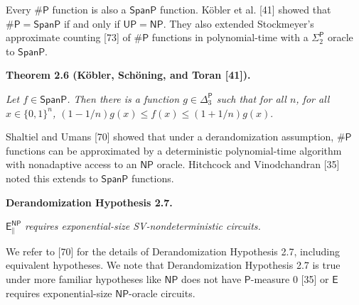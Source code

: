 Every ${\mathsf{\#}\mathsf{P}}$ function is also a $\mathsf{SpanP}$ function. Köbler et al. [41] showed that ${\mathsf{\#}\mathsf{P}}=\mathsf{SpanP}$ if and only if $\mathsf{UP}=\mathsf{NP}$.
They also extended Stockmeyer’s approximate counting [73] of ${\mathsf{\#}\mathsf{P}}$ functions in polynomial-time with a $\Sigma^{\mathsf{P}}_{2}$ oracle to $\mathsf{SpanP}$.\par





\par\medskip\noindent\textbf{
\textbf{Theorem 2.6}\textbf{ }(Köbler, Schöning, and Toran [41])\textbf{.}
}\par



\emph{Let $f\in\mathsf{SpanP}$. Then there is
a function $g\in{\Delta^{\mathsf{P}}_{3}}$ such that for all $n$, for all $x\in\{0,1\}^{n}$,
$(1-1/n)g(x)\leq f(x)\leq(1+1/n)g(x).$}\par






Shaltiel and Umans [70] showed that under a derandomization
assumption, ${\mathsf{\#}\mathsf{P}}$ functions can be approximated by a deterministic
polynomial-time algorithm with nonadaptive access to an $\mathsf{NP}$ oracle. Hitchcock and Vinodchandran [35] noted this extends to $\mathsf{SpanP}$ functions.\par





\par\medskip\noindent\textbf{
\textbf{Derandomization Hypothesis 2.7}\textbf{.}
}\par



$\mathsf{E}^{\mathsf{NP}}_{\parallel}$\emph{ requires exponential-size SV-nondeterministic circuits.}\par






We refer to [70] for the details of Derandomization Hypothesis 2.7, including equivalent hypotheses. We note that Derandomization Hypothesis 2.7 is true under more familiar hypotheses like $\mathsf{NP}$ does not have $\mathsf{P}$-measure 0 [35] or $\mathsf{E}$ requires exponential-size $\mathsf{NP}$-oracle circuits.\par



